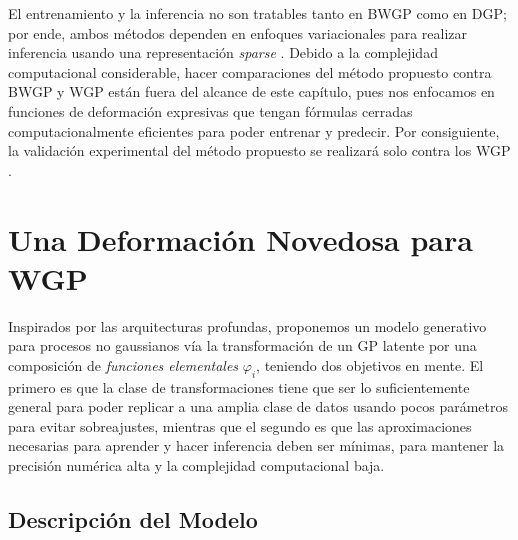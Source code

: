 El entrenamiento y la inferencia no son tratables tanto en BWGP como en DGP; por ende, ambos métodos dependen en enfoques variacionales para realizar inferencia usando una representación \emph{sparse} \cite{titsias2009variational}. Debido a la complejidad computacional considerable, hacer comparaciones del método propuesto contra BWGP y WGP están fuera del alcance de este capítulo, pues nos enfocamos en funciones de deformación expresivas que tengan fórmulas cerradas computacionalmente eficientes para poder entrenar y predecir. Por consiguiente, la validación experimental del método propuesto se realizará solo contra los WGP \cite{snelson2004warped}.

\section{Una Deformación Novedosa para WGP}
\label{sec:novelWGP}
Inspirados por las arquitecturas profundas, proponemos un modelo generativo para procesos no gaussianos vía la transformación de un GP latente por una composición de \emph{funciones elementales} \(\varphi_i\), teniendo dos objetivos en mente. El primero es que la clase de transformaciones tiene que ser lo suficientemente general para poder replicar a una amplia clase de datos usando pocos parámetros para evitar sobreajustes, mientras que el segundo es que las aproximaciones necesarias para aprender y hacer inferencia deben ser mínimas, para mantener la precisión numérica alta y la complejidad computacional baja.

\subsection{Descripción del Modelo}
\label{sub:model_description}

